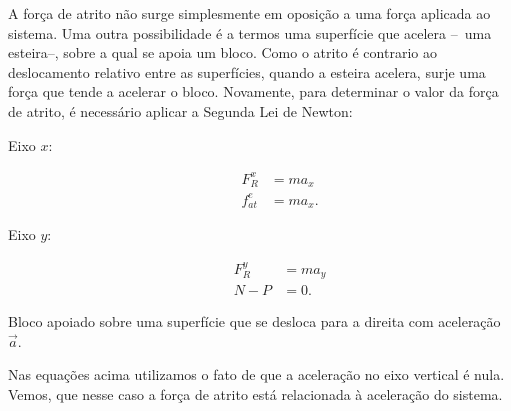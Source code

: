 A força de atrito não surge simplesmente em oposição a uma força aplicada ao sistema. Uma outra possibilidade é a termos uma superfície que acelera --~uma esteira--, sobre a qual se apoia um bloco. Como o atrito é contrario ao deslocamento relativo entre as superfícies, quando a esteira acelera, surje uma força que tende a acelerar o bloco. Novamente, para determinar o valor da força de atrito, é necessário aplicar a Segunda Lei de Newton:
\begin{description}
    \item[Eixo $x$:]
        \begin{align}
            F_R^x &= m a_x \\
            f_{at}^e &= m a_x.
        \end{align}
    \item[Eixo $y$:]
        \begin{align}
            F_R^y &= m a_y \\
            N - P &= 0.
        \end{align}
\end{description}

\begin{marginfigure}
\centering
{}
\caption{Bloco apoiado sobre uma superfície que se desloca para a direita com aceleração $\vec{a}$.}
\end{marginfigure}
%
Nas equações acima utilizamos o fato de que a aceleração no eixo vertical é nula. Vemos, que nesse caso a força de atrito está relacionada à aceleração do sistema.

